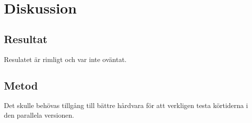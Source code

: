 \section{Diskussion}
\subsection{Resultat}
Resulatet är rimligt och var inte oväntat. 
\subsection{Metod}
Det skulle behövas tillgång till bättre hårdvara för att verkligen testa körtiderna i den parallela versionen.